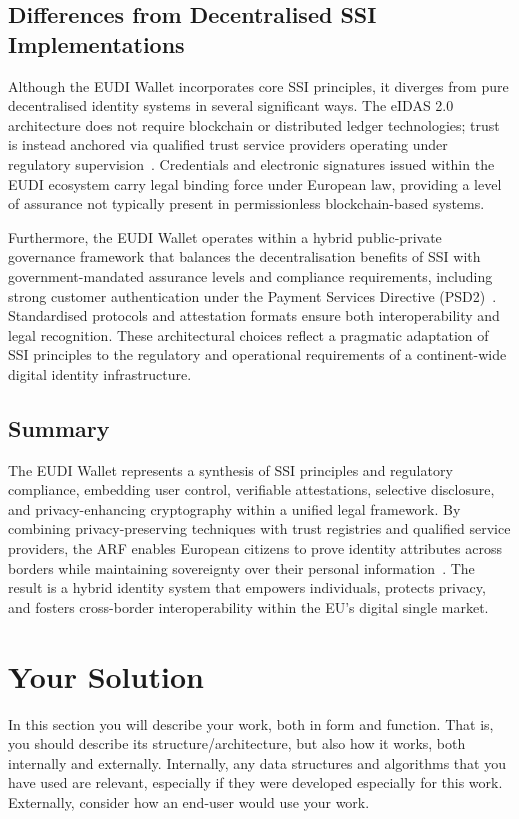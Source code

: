 \documentclass[sigconf,balance,nonacm,authordraft]{acmart}
\begin{document}
\subsection{Differences from Decentralised SSI Implementations}

Although the EUDI Wallet incorporates core SSI principles, it diverges from pure decentralised identity systems in several significant ways. The eIDAS 2.0 architecture does not require blockchain or distributed ledger technologies; trust is instead anchored via qualified trust service providers operating under regulatory supervision~\cite{Finextra_SSI_Differences}. Credentials and electronic signatures issued within the EUDI ecosystem carry legal binding force under European law, providing a level of assurance not typically present in permissionless blockchain-based systems.

Furthermore, the EUDI Wallet operates within a hybrid public-private governance framework that balances the decentralisation benefits of SSI with government-mandated assurance levels and compliance requirements, including strong customer authentication under the Payment Services Directive (PSD2)~\cite{Finextra_SSI_Differences}. Standardised protocols and attestation formats ensure both interoperability and legal recognition. These architectural choices reflect a pragmatic adaptation of SSI principles to the regulatory and operational requirements of a continent-wide digital identity infrastructure.

\subsection{Summary}

The EUDI Wallet represents a synthesis of SSI principles and regulatory compliance, embedding user control, verifiable attestations, selective disclosure, and privacy-enhancing cryptography within a unified legal framework. By combining privacy-preserving techniques with trust registries and qualified service providers, the ARF enables European citizens to prove identity attributes across borders while maintaining sovereignty over their personal information~\cite{EU_ARF2024,EU_eIDAS2024}. The result is a hybrid identity system that empowers individuals, protects privacy, and fosters cross-border interoperability within the EU's digital single market.
\section{Your Solution}
\label{sec:solution}
In this section you will describe your work, both in form and function. That is, you should describe its structure/architecture, but also how it works, both internally and externally. Internally, any data structures and algorithms that you have used are relevant, especially if they were developed especially for this work. Externally, consider how an end-user would use your work.
\end{document}
